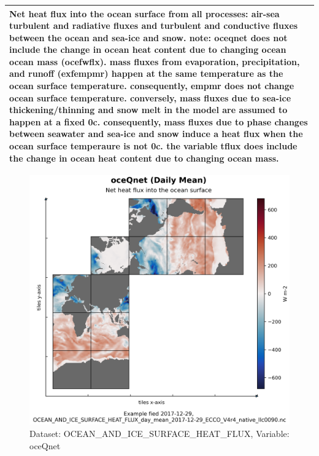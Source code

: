\begin{longtable}{|m{}|m{}|m{}|m{}|}
\multicolumn{4}{|p{1\textwidth}|}{Net heat flux into the ocean surface from all processes: air-sea turbulent and radiative fluxes and turbulent and conductive fluxes between the ocean and sea-ice and snow. note: oceqnet does not include the change in ocean heat content due to changing ocean ocean mass (ocefwflx). mass fluxes from evaporation, precipitation, and runoff (exfempmr) happen at the same temperature as the ocean surface temperature. consequently, empmr does not change ocean surface temperature. conversely, mass fluxes due to sea-ice thickening/thinning and snow melt in the model are assumed to happen at a fixed 0c. consequently, mass fluxes due to phase changes between seawater and sea-ice and snow induce a heat flux when the ocean surface temperaure is not 0c. the variable tflux does include the change in ocean heat content due to changing ocean mass.} \\ \hline
\end{longtable}

\begin{figure}[H]
\centering
\includegraphics[scale=0.55]{../images/plots/native_plots/Ocean_and_Sea-Ice_Surface_Heat_Fluxes/oceQnet.png}
\caption{Dataset: OCEAN\_AND\_ICE\_SURFACE\_HEAT\_FLUX, Variable: oceQnet}
\label{tab:table-OCEAN_AND_ICE_SURFACE_HEAT_FLUX_oceQnet-Plot}
\end{figure}
\pagebreak
